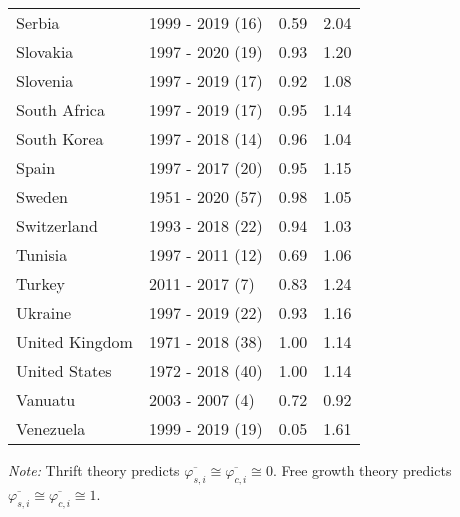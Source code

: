 \begin{table}[H]
{{\begin{tabular}{llrr}
Serbia & 1999 - 2019 (16) & 0.59 & 2.04\\
Slovakia & 1997 - 2020 (19) & 0.93 & 1.20\\
\addlinespace
Slovenia & 1997 - 2019 (17) & 0.92 & 1.08\\
South Africa & 1997 - 2019 (17) & 0.95 & 1.14\\
South Korea & 1997 - 2018 (14) & 0.96 & 1.04\\
Spain & 1997 - 2017 (20) & 0.95 & 1.15\\
Sweden & 1951 - 2020 (57) & 0.98 & 1.05\\
\addlinespace
Switzerland & 1993 - 2018 (22) & 0.94 & 1.03\\
Tunisia & 1997 - 2011 (12) & 0.69 & 1.06\\
Turkey & 2011 - 2017 (7) & 0.83 & 1.24\\
Ukraine & 1997 - 2019 (22) & 0.93 & 1.16\\
United Kingdom & 1971 - 2018 (38) & 1.00 & 1.14\\
\addlinespace
United States & 1972 - 2018 (40) & 1.00 & 1.14\\
Vanuatu & 2003 - 2007 (4) & 0.72 & 0.92\\
Venezuela & 1999 - 2019 (19) & 0.05 & 1.61\\
\bottomrule
\end{tabular}

}

}


\label{tbl-indicator_table}
\begin{flushleft}
\footnotesize \emph{Note:} Thrift theory predicts \(\overline{\varphi_{s,i}} \cong \overline{\varphi_{c,i}} \cong 0\). Free growth theory predicts \(\overline{\varphi_{s,i}} \cong \overline{\varphi_{c,i}} \cong 1\).
\end{flushleft}
\end{table}